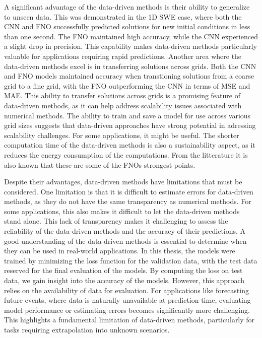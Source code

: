 A significant advantage of the data-driven methods is their ability to generalize to unseen data.
This was demonstrated in the 1D SWE case, where both the CNN and FNO successfully predicted solutions for new initial conditions in less than one second.
The FNO maintained high accuracy, while the CNN experienced a slight drop in precision.
This capability makes data-driven methods particularly valuable for applications requiring rapid predictions.
Another area where the data-driven methods excel is in transferring solutions across grids.
Both the CNN and FNO models maintained accuracy when transtioning solutions from a coarse grid to a fine grid, with the FNO outperforming the CNN in terms of MSE and MAE.
This ability to transfer solutions across grids is a promising feature of data-driven methods, as it can help address scalability issues associated with numerical methods.
The ability to train and save a model for use across various grid sizes suggests that data-driven approaches have strong potential in adressing scalability challenges. 
For some applications, it might be useful.
The shorter computation time of the data-driven methods is also a sustainability aspect, as it reduces the energy consumption of the computations.
From the litterature it is also known that these are some of the FNOs strongest points.

Despite their advantages, data-driven methods have limitations that must be considered.
One limitation is that it is difficult to estimate errors for data-driven methods, as they do not have the same transparency as numerical methods.
For some applications, this also makes it difficult to let the data-driven methods stand alone.
This lack of transparency makes it challenging to assess the reliability of the data-driven methods and the accuracy of their predictions.
A good understanding of the data-driven methods is essential to determine when they can be used in real-world applications.
In this thesis, the models were trained by minimizing the loss function for the validation data, with the test data reserved for the final evaluation of the models.
By computing the loss on test data, we gain insight into the accuracy of the models.
However, this approach relies on the availability of data for evaluation.
For applications like forecasting future events, where data is naturally unavailable at prediction time, evaluating model performance or estimating errors becomes significantly more challenging.
This highlights a fundamental limitation of data-driven methods, particularly for tasks requiring extrapolation into unknown scenarios.

